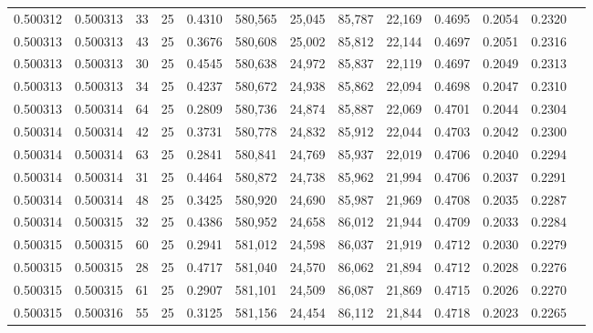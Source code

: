 \begin{tabular}{rrrrrrrrrrrrr}
0.500312 & 0.500313 &    33 &  25 &                                     0.4310 & 580,565 &  25,045 &  85,787 &  22,169 & 0.4695 & 0.2054 & 0.2320 \\
0.500313 & 0.500313 &    43 &  25 &                                     0.3676 & 580,608 &  25,002 &  85,812 &  22,144 & 0.4697 & 0.2051 & 0.2316 \\
0.500313 & 0.500313 &    30 &  25 &                                     0.4545 & 580,638 &  24,972 &  85,837 &  22,119 & 0.4697 & 0.2049 & 0.2313 \\
0.500313 & 0.500313 &    34 &  25 &                                     0.4237 & 580,672 &  24,938 &  85,862 &  22,094 & 0.4698 & 0.2047 & 0.2310 \\
0.500313 & 0.500314 &    64 &  25 &                                     0.2809 & 580,736 &  24,874 &  85,887 &  22,069 & 0.4701 & 0.2044 & 0.2304 \\
0.500314 & 0.500314 &    42 &  25 &                                     0.3731 & 580,778 &  24,832 &  85,912 &  22,044 & 0.4703 & 0.2042 & 0.2300 \\
0.500314 & 0.500314 &    63 &  25 &                                     0.2841 & 580,841 &  24,769 &  85,937 &  22,019 & 0.4706 & 0.2040 & 0.2294 \\
0.500314 & 0.500314 &    31 &  25 &                                     0.4464 & 580,872 &  24,738 &  85,962 &  21,994 & 0.4706 & 0.2037 & 0.2291 \\
0.500314 & 0.500314 &    48 &  25 &                                     0.3425 & 580,920 &  24,690 &  85,987 &  21,969 & 0.4708 & 0.2035 & 0.2287 \\
0.500314 & 0.500315 &    32 &  25 &                                     0.4386 & 580,952 &  24,658 &  86,012 &  21,944 & 0.4709 & 0.2033 & 0.2284 \\
0.500315 & 0.500315 &    60 &  25 &                                     0.2941 & 581,012 &  24,598 &  86,037 &  21,919 & 0.4712 & 0.2030 & 0.2279 \\
0.500315 & 0.500315 &    28 &  25 &                                     0.4717 & 581,040 &  24,570 &  86,062 &  21,894 & 0.4712 & 0.2028 & 0.2276 \\
0.500315 & 0.500315 &    61 &  25 &                                     0.2907 & 581,101 &  24,509 &  86,087 &  21,869 & 0.4715 & 0.2026 & 0.2270 \\
0.500315 & 0.500316 &    55 &  25 &                                     0.3125 & 581,156 &  24,454 &  86,112 &  21,844 & 0.4718 & 0.2023 & 0.2265 \\

\end{tabular}
